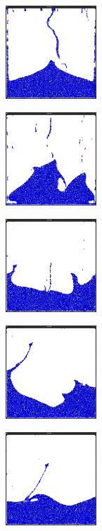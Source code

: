 \begin{figure}[ht!]
\begin{subfigure}[]{}
\includegraphics[height=35mm]{png/multigrid4.png}
\end{subfigure}
\begin{subfigure}[]{}
\includegraphics[height=35mm]{png/multigrid5.png}
\end{subfigure}
\begin{subfigure}[]{}
\includegraphics[height=35mm]{png/multigrid6.png}
\end{subfigure}
\begin{subfigure}[]{}
\includegraphics[height=35mm]{png/multigrid7.png}
\end{subfigure}
\begin{subfigure}[]{}
\includegraphics[height=35mm]{png/multigrid8.png}

\end{subfigure}
\end{figure}

